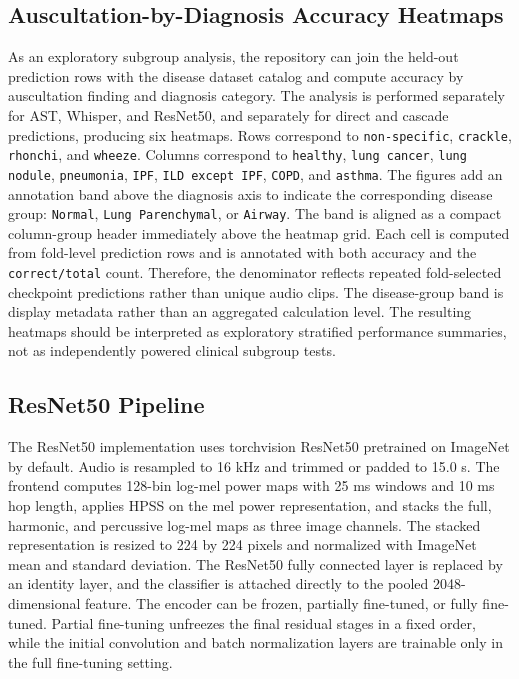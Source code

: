 \documentclass[11pt]{article}
\begin{document}
\subsection{Auscultation-by-Diagnosis Accuracy Heatmaps}

As an exploratory subgroup analysis, the repository can join the held-out
prediction rows with the disease dataset catalog and compute accuracy by
auscultation finding and diagnosis category. The analysis is performed
separately for AST, Whisper, and ResNet50, and separately for direct and
cascade predictions, producing six heatmaps. Rows correspond to
\texttt{non-specific}, \texttt{crackle}, \texttt{rhonchi}, and
\texttt{wheeze}. Columns correspond to \texttt{healthy},
\texttt{lung cancer}, \texttt{lung nodule}, \texttt{pneumonia}, \texttt{IPF},
\texttt{ILD except IPF}, \texttt{COPD}, and \texttt{asthma}. The figures add
an annotation band above the diagnosis axis to indicate the corresponding
disease group: \texttt{Normal}, \texttt{Lung Parenchymal}, or
\texttt{Airway}. The band is aligned as a compact column-group header
immediately above the heatmap grid. Each cell is computed from fold-level
prediction rows and is annotated with both accuracy and the
\texttt{correct/total} count. Therefore, the denominator reflects repeated
fold-selected checkpoint predictions rather than unique audio clips. The
disease-group band is display metadata rather than an aggregated calculation
level. The resulting heatmaps should be interpreted as exploratory stratified
performance summaries, not as independently powered clinical subgroup tests.

\subsection{ResNet50 Pipeline}

The ResNet50 implementation uses torchvision ResNet50 pretrained on ImageNet
by default. Audio is resampled to 16 kHz and trimmed or padded to 15.0 s. The
frontend computes 128-bin log-mel power maps with 25 ms windows and 10 ms hop
length, applies HPSS on the mel power representation, and stacks the full,
harmonic, and percussive log-mel maps as three image channels. The stacked
representation is resized to 224 by 224 pixels and normalized with ImageNet
mean and standard deviation. The ResNet50 fully connected layer is replaced by
an identity layer, and the classifier is attached directly to the pooled
2048-dimensional feature. The encoder can be frozen, partially fine-tuned, or
fully fine-tuned. Partial fine-tuning unfreezes the final residual stages in a
fixed order, while the initial convolution and batch normalization layers are
trainable only in the full fine-tuning setting.
\end{document}
